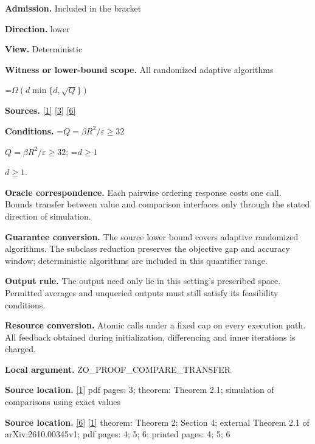 \documentclass[10pt,a4paper]{article}
\newcommand{\AtlasMath}[1]{\par\begingroup\centering\setbox0=\hbox{$\displaystyle #1$}\ifdim\wd0>1.4\linewidth\typeout{ATLAS WIDE FORMULA: \the\wd0}\fi\ifdim\wd0>\linewidth\resizebox{\linewidth}{!}{\box0}\else\box0\fi\par\endgroup}
\newcommand{\AtlasInlineMath}[1]{\begingroup\setbox0=\hbox{$#1$}\ifdim\wd0>.4\linewidth\endgroup\AtlasMath{#1}\else\endgroup$#1$\fi}
\begin{document}
\textbf{Admission.} Included in the bracket



\textbf{Direction.} lower



\textbf{View.} Deterministic



\textbf{Witness or lower-bound scope.} All randomized adaptive algorithms



\AtlasMath{\Omega(d\min\{d,\sqrt Q\})}


\textbf{Sources.} \href{https://arxiv.org/html/2610.00345v1}{[1]} \href{https://arxiv.org/html/2610.19652v1}{[3]} \href{https://github.com/WU-Wendao/Colombo/blob/main/colombo_sensorium/Complexity_altas/data/sources/colombo/COLOMBO_KIMI_002/kimi_002.pdf}{[6]}



\textbf{Conditions.} \AtlasInlineMath{Q=\beta R^2/\varepsilon \ge 32}; \AtlasInlineMath{d\ge 1}.



\textbf{Oracle correspondence.} Each pairwise ordering response costs one call. Bounds transfer between value and comparison interfaces only through the stated direction of simulation.



\textbf{Guarantee conversion.} The source lower bound covers adaptive randomized algorithms. The subclass reduction preserves the objective gap and accuracy window; deterministic algorithms are included in this quantifier range.



\textbf{Output rule.} The output need only lie in this setting's prescribed space. Permitted averages and unqueried outputs must still satisfy its feasibility conditions.



\textbf{Resource conversion.} Atomic calls under a fixed cap on every execution path. All feedback obtained during initialization, differencing and inner iterations is charged.



\textbf{Local argument.} ZO\_PROOF\_COMPARE\_TRANSFER



\textbf{Source location.} \href{https://arxiv.org/html/2610.00345v1}{[1]} pdf pages: 3; theorem: Theorem 2.1; simulation of comparisons using exact values



\textbf{Source location.} \href{https://github.com/WU-Wendao/Colombo/blob/main/colombo_sensorium/Complexity_altas/data/sources/colombo/COLOMBO_KIMI_002/kimi_002.pdf}{[6]} \href{https://arxiv.org/html/2610.00345v1}{[1]} theorem: Theorem 2; Section 4; external Theorem 2.1 of arXiv:2610.00345v1; pdf pages: 4; 5; 6; printed pages: 4; 5; 6
\end{document}
